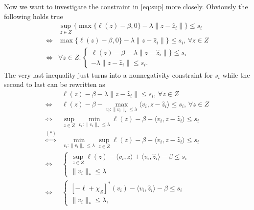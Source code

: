 \documentclass{scrartcl}
\begin{document}
Now we want to investigate the constraint in \eqref{eq:sup} more closely.
Obviously the following holds true
\begin{equation}
  \label{eq:inequality}
  \begin{aligned}
    & \sup_{z \in Z}\{ \max\{ \ell (z) - \beta, 0 \} - \lambda \lVert z-\hat{z}_i  \rVert \} \le s_i \\
    \Leftrightarrow & \max\{ \ell (z) - \beta, 0 \} - \lambda \lVert z-\hat{z}_i  \rVert \} \le s_i, \, \forall z \in Z \\
    \Leftrightarrow & \forall z \in Z :
    \begin{cases}
      \ell (z) - \beta - \lambda \lVert z-\hat{z}_i  \rVert \} \le s_i \\
      - \lambda \lVert z-\hat{z}_i \rVert \le s_i.
    \end{cases}
  \end{aligned}
\end{equation}
The very last inequality just turns into a nonnegativity constraint for $s_i$
while the second to last can be rewritten as
\begin{equation}
  \label{eq:dual_norm}
  \begin{aligned}
    & \ell (z) - \beta - \lambda \lVert z-\hat{z}_i \rVert \le s_i, \, \forall z \in Z \\
    \Leftrightarrow & \ell (z) - \beta - \max_{v_i:\lVert {v_i} \rVert_*\le \lambda} \langle v_i, z-\hat{z}_i \rangle \le s_i, \, \forall z \in Z \\
    \Leftrightarrow & \sup_{z \in Z} \min_{v_i:\lVert {v_i} \rVert_*\le \lambda} \ell(z) - \beta - \langle v_i, z-\hat{z}_i \rangle \le s_i \\
    \overset{(*)}{\Leftrightarrow} &  \min_{v_i:\lVert {v_i} \rVert_*\le \lambda} \sup_{z \in Z} \ell(z) - \beta - \langle v_i, z-\hat{z}_i \rangle \le s_i \\
    \Leftrightarrow &
    \begin{cases}
      \sup_{z \in Z} \ell(z) - \langle v_i, z\rangle + \langle v_i, \hat{z}_i \rangle -\beta \le s_i \\
      \lVert {v_i} \rVert_* \le \lambda 
    \end{cases}\\
    \Leftrightarrow &
     \begin{cases}
       [-\ell+ \chi_Z]^*(v_i) - \langle v_i, \hat{z}_i \rangle -\beta \le s_i \\
      \lVert {v_i} \rVert_* \le \lambda, 
    \end{cases}\\
  \end{aligned}
\end{equation}
\end{document}
